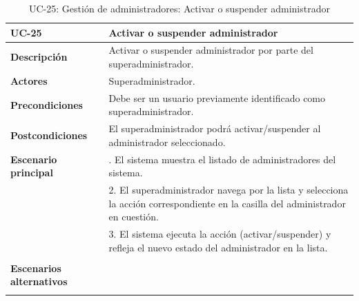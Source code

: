 \begin{table}
  \begin{center}
    \begin{tabularx}{16.4cm}{|l|X|}
      \hline
      \textbf{UC-25} & \textbf{Activar o suspender administrador}\\
      \hline
      \textbf{Descripción} & Activar o suspender administrador por parte del superadministrador. \\
      \hline
      \textbf{Actores} & Superadministrador.\\
      \hline
      \textbf{Precondiciones} & Debe ser un usuario previamente identificado como superadministrador.\\
      \hline
      \textbf{Postcondiciones} & El superadministrador podrá activar/suspender al administrador seleccionado.\\
      \hline
      \textbf{Escenario principal} & \smallskip 1. El sistema muestra el listado de administradores del sistema.\\
      & 2. El superadministrador navega por la lista y selecciona la acción correspondiente en la casilla del administrador en cuestión.\\
      & 3. El sistema ejecuta la acción (activar/suspender) y refleja el nuevo estado del administrador en la lista. \\
      & \\
      \hline
      \textbf{Escenarios alternativos} & \\
      & \\
      \hline
    \end{tabularx}
    \caption{UC-25: Gestión de administradores: Activar o suspender administrador}
    \label{tab:CU-activar-suspender-admin}
  \end{center}
\end{table}


